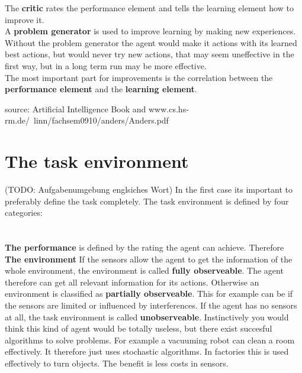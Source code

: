 \documentclass[10pt,a4paper,DIV=11]{scrreprt}
\begin{document}
The \textbf{critic} rates the performance element and tells the learning element how to improve it. \\

A \textbf{problem generator} is used to improve learning by making new experiences. Without the problem generator the agent would make it actions with its learned best actions, but would never try new actions, that may seem uneffective in the first way, but in a long term run may be more effective. \\

The most important part for improvements is the correlation between the \textbf{performance element} and the \textbf{learning element}.





source: Artificial Intelligence Book and www.cs.hs-rm.de/~linn/fachsem0910/anders/Anders.pdf


\section{The task environment}
(TODO: Aufgabenumgebung englsiches Wort)
In the first case its important to preferably define the task completely. The task environment is defined by four categories: \\

   \\
\\

\textbf{The performance} is defined by the rating the agent can achieve. Therefore \\

\textbf{The environment}
If the sensors allow the agent to get the information of the whole environment, the environment is called \textbf{fully observeable}. The agent therefore can get all relevant information for its actions. Otherwise an environment is classified as \textbf{partially observeable}. This for example can be if the sensors are limited or influenced by interferences.
If the agent has no sensors at all, the task environment is called \textbf{unobserveable}. Instinctively you would think this kind of agent would be totally useless, but there exist succesful algorithms to solve problems. For example a vacuuming robot can clean a room effectively. It therefore just uses stochastic algorithms. In factories this is used effectively to  turn objects. The benefit is less costs in sensors. \\
\end{document}

